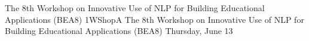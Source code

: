 \begin{wsschedule}
{The 8th Workshop on Innovative Use of NLP for Building Educational Applications (BEA8)}
{1}{WShopA}
{The 8th Workshop on Innovative Use of NLP for Building Educational Applications (BEA8)}
{Thursday, June 13}{\WShopLocA}

\end{wsschedule}
